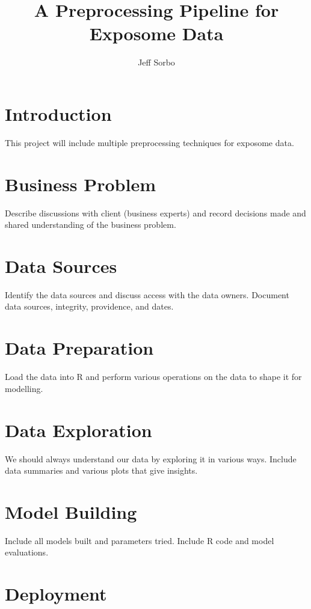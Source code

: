 \documentclass[a4paper]{article}\usepackage[]{graphicx}\usepackage[]{color}
\begin{document}
\title{A Preprocessing Pipeline for Exposome Data}
\author{Jeff Sorbo}
\maketitle\thispagestyle{empty}

\section{Introduction}

This project will include multiple preprocessing techniques for exposome data.

\section{Business Problem}

Describe discussions with client (business experts) and record
decisions made and shared understanding of the business problem.

\section{Data Sources}

Identify the data sources and discuss access with the data
owners. Document data sources, integrity, providence, and dates.

\section{Data Preparation}

Load the data into R and perform various operations on the data to
shape it for modelling.

\section{Data Exploration}

We should always understand our data by exploring it in various
ways. Include data summaries and various plots that give insights.

\section{Model Building}

Include all models built and parameters tried. Include R code and
model evaluations.

\section{Deployment}
\end{document}
